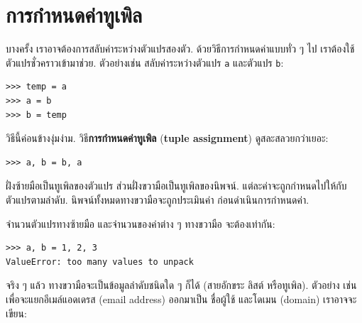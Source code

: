 \section{การกำหนดค่าทูเพิล}
\label{tuple.assignment}


บางครั้ง เราอาจต้องการสลับค่าระหว่างตัวแปรสองตัว.
ด้วยวิธีการกำหนดค่าแบบทั่ว ๆ ไป
เราต้องใช้ตัวแปรชั่วคราวเข้ามาช่วย.
ตัวอย่างเช่น สลับค่าระหว่างตัวแปร \texttt{a} และตัวแปร \texttt{b}:

\begin{verbatim}
>>> temp = a
>>> a = b
>>> b = temp
\end{verbatim}
%
%
วิธีนี้ค่อนข้างงุ่มง่าม.
วิธี\textbf{การกำหนดค่าทูเพิล} (\textbf{tuple assignment}) ดูสละสลวยกว่าเยอะ:

\begin{verbatim}
>>> a, b = b, a
\end{verbatim}
%
%
ฝั่งซ้ายมือเป็นทูเพิลของตัวแปร
ส่วนฝั่งขวามือเป็นทูเพิลของนิพจน์.
แต่ละค่าจะถูกกำหนดไปให้กับตัวแปรตามลำดับ.
นิพจน์ทั้งหมดทางขวามือจะถูกประเมินค่า ก่อนดำเนินการกำหนดค่า.


จำนวนตัวแปรทางซ้ายมือ และจำนวนของค่าต่าง ๆ ทางขวามือ จะต้องเท่ากัน:

\begin{verbatim}
>>> a, b = 1, 2, 3
ValueError: too many values to unpack
\end{verbatim}
%
%
จริง ๆ แล้ว ทางขวามือจะเป็นข้อมูลลำดับชนิดใด ๆ ก็ได้ (สายอักขระ ลิสต์ หรือทูเพิล).
ตัวอย่าง เช่น เพื่อจะแยกอีเมล์แอดเดรส (email address) ออกมาเป็น ชื่อผู้ใช้ และโดเมน (domain) เราอาจจะเขียน:

